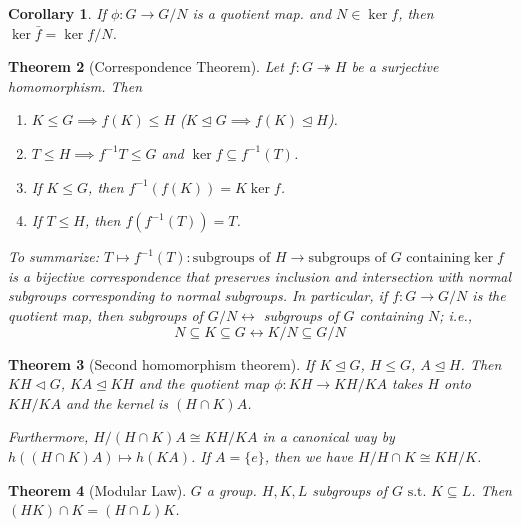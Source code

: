 \documentclass{amsart}
\newtheorem{thm}{Theorem}[section]
\newtheorem{cor}[thm]{Corollary}
\theoremstyle{definition}
\newcommand{\st}{\text{ s.t. }}
\begin{document}
\begin{cor}
If $\phi:G\to G/N$ is a quotient map. and $N\in\ker f$, then $\ker \bar f=\ker f/N$.	
\end{cor}
\begin{thm}[Correspondence Theorem]
	Let $f:G\twoheadrightarrow H$ be a surjective homomorphism. Then
	\begin{enumerate}
		\item $K\leq G\implies f(K)\leq H$ ($K\unlhd G\implies f(K)\unlhd H$).
		\item $T\leq H\implies f^{-1}T\leq G$ and $\ker f\subseteq f^{-1}(T)$.
		\item If $K\leq G$, then $f^{-1}(f(K))=K\ker f$.
		\item If $T\leq H$, then $f(f^{-1}(T))=T$.	
	\end{enumerate}
To summarize: $T\mapsto f^{-1}(T):\text{subgroups of }H\to \text{subgroups of }G \text{ containing} \ker f$ is a bijective correspondence that preserves inclusion and intersection with normal subgroups corresponding to normal subgroups. In particular, if $f:G\to G/N$ is the quotient map, then subgroups of $G/N\leftrightarrow$ subgroups of $G$ containing $N$; i.e.,
$$N\subseteq K\subseteq G\leftrightarrow K/N\subseteq G/N$$ 
\end{thm}
\begin{thm}[Second homomorphism theorem]
If $K\unlhd G$, $H\leq G$, $A\unlhd H$. Then $KH\lhd G$, $KA\unlhd KH$ and the quotient map $\phi:KH\to KH/KA$ takes $H$ onto $KH/KA$ and the kernel is $(H\cap K)A$.

	Furthermore, $H/(H\cap K)A\cong KH/KA$ in a canonical way by $h((H\cap K)A)\mapsto h(KA)$. If $A=\{e\}$, then we have $H/H\cap K\cong KH/K$.
\end{thm}
\begin{thm}[Modular Law]
$G$ a group. $H,K,L$ subgroups of $G\st K\subseteq L$. Then $(HK)\cap K=(H\cap L)K$.	
\end{thm}
\end{document}
